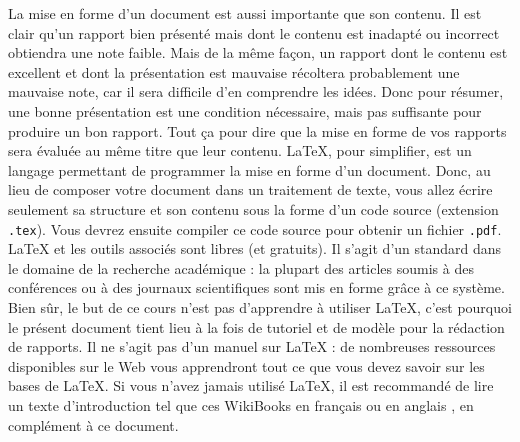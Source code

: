 \documentclass{ceri}
\begin{document}
La mise en forme d'un document est aussi importante que son contenu. Il est clair qu'un rapport bien présenté mais dont le contenu est inadapté ou incorrect obtiendra une note faible. Mais de la même façon, un rapport dont le contenu est excellent et dont la présentation est mauvaise récoltera probablement une mauvaise note, car il sera difficile d'en comprendre les idées. Donc pour résumer, une bonne présentation est une condition nécessaire, mais pas suffisante pour produire un bon rapport. Tout ça pour dire que la mise en forme de vos rapports sera évaluée au même titre que leur contenu.
\LaTeX{}, pour simplifier, est un langage permettant de programmer la mise en forme d'un document. Donc, au lieu de composer votre document dans un traitement de texte, vous allez écrire seulement sa structure et son contenu sous la forme d'un code source (extension \texttt{.tex}). Vous devrez ensuite compiler ce code source pour obtenir un fichier \texttt{.pdf}.
\LaTeX{} et les outils associés sont libres (et gratuits). Il s'agit d'un standard dans le domaine de la recherche académique : la plupart des articles soumis à des conférences ou à des journaux scientifiques sont mis en forme gr\^ace à ce système.
Bien s\^ur, le but de ce cours n'est pas d'apprendre à utiliser \LaTeX{}, c'est pourquoi le présent document tient lieu à la fois de tutoriel et de modèle pour la rédaction de rapports. Il ne s'agit pas d'un manuel sur \LaTeX{} : de nombreuses ressources disponibles sur le Web vous apprendront tout ce que vous devez savoir sur les bases de \LaTeX{}. Si vous n'avez jamais utilisé \LaTeX{}, il est recommandé de lire un texte d'introduction tel que ces WikiBooks en français \cite{Wikibooks2010} ou en anglais \cite{Wikibooks2011}, en complément à ce document.
\end{document}
